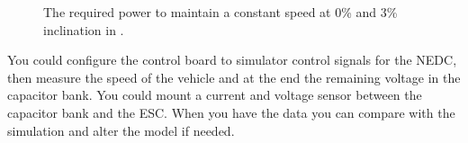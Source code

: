 \documentclass[final]{scrreprt} %
\begin{document}
\begin{figure}[H]
	\centering
    	\setlength\figureheight{4cm}
    	\setlength{}
    	
    	\label{fig:power-req-labcar}
    	\caption{The required power to maintain a constant speed at 0\% and 3\% inclination in \watt.}
\end{figure}
You could configure the control board to simulator control signals for the NEDC, then measure the speed of the vehicle and at the end the remaining voltage in the capacitor bank.
You could mount a current and voltage sensor between the capacitor bank and the ESC.
When you have the data you can compare with the simulation and alter the model if needed.
\end{document}
